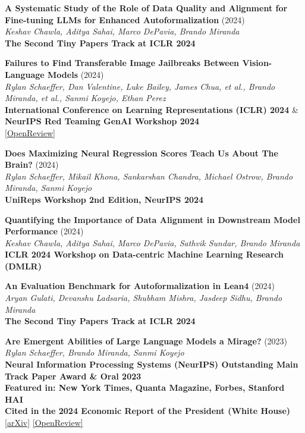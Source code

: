 \documentclass{article}
\newenvironment{changemargin}[2]{%
  \begin{list}{}{%
    \setlength{\topsep}{0pt}%
    \setlength{\leftmargin}{#1}%
    \setlength{\rightmargin}{#2}%
    \setlength{\listparindent}{\parindent}%
    \setlength{\itemindent}{\parindent}%
    \setlength{\parsep}{\parskip}%
  }%
  \item[]}{\end{list}
}
\newenvironment{body} {
	\vspace*{-16pt}
	\begin{changemargin}{-0.25in}{-0.5in}
  }	
	{\end{changemargin}
}
\begin{document}
\begin{body}
    \vspace{10pt}
    \textbf{A Systematic Study of the Role of Data Quality and Alignment for Fine-tuning LLMs for Enhanced Autoformalization} (2024)\\
    \emph{Keshav Chawla, Aditya Sahai, Marco DePavia, Brando Miranda}\\
    \textbf{The Second Tiny Papers Track at ICLR 2024}

    \vspace{10pt}
    \textbf{Failures to Find Transferable Image Jailbreaks Between Vision-Language Models} (2024)\\
    \emph{Rylan Schaeffer, Dan Valentine, Luke Bailey, James Chua, et al., Brando Miranda, et al., Sanmi Koyejo, Ethan Perez}\\
    \textbf{International Conference on Learning Representations (ICLR) 2024} \& \textbf{NeurIPS Red Teaming GenAI Workshop 2024}\\
    \href{https://openreview.net/forum?id=wvFnqVVUhN}{[OpenReview]}

    \vspace{10pt}
    \textbf{Does Maximizing Neural Regression Scores Teach Us About The Brain?} (2024)\\
    \emph{Rylan Schaeffer, Mikail Khona, Sankarshan Chandra, Michael Ostrow, Brando Miranda, Sanmi Koyejo}\\
    \textbf{UniReps Workshop 2nd Edition, NeurIPS 2024}

    \vspace{10pt}
    \textbf{Quantifying the Importance of Data Alignment in Downstream Model Performance} (2024)\\
    \emph{Keshav Chawla, Aditya Sahai, Marco DePavia, Sathvik Sundar, Brando Miranda}\\
    \textbf{ICLR 2024 Workshop on Data-centric Machine Learning Research (DMLR)}

    \vspace{10pt}
    \textbf{An Evaluation Benchmark for Autoformalization in Lean4} (2024)\\
    \emph{Aryan Gulati, Devanshu Ladsaria, Shubham Mishra, Jasdeep Sidhu, Brando Miranda}\\
    \textbf{The Second Tiny Papers Track at ICLR 2024}

    \vspace{10pt}
    \textbf{Are Emergent Abilities of Large Language Models a Mirage?} (2023)\\
    \emph{Rylan Schaeffer, Brando Miranda, Sanmi Koyejo}\\
    \textbf{Neural Information Processing Systems (NeurIPS) Outstanding Main Track Paper Award \& Oral 2023}\\
    \textbf{Featured in: New York Times, Quanta Magazine, Forbes, Stanford HAI}\\
    \textbf{Cited in the 2024 Economic Report of the President (White House)}\\
    \href{https://arxiv.org/abs/2304.15004}{[arXiv]} \href{https://openreview.net/forum?id=ITw9edRDlD}{[OpenReview]}
    

\end{body}
\end{document}
